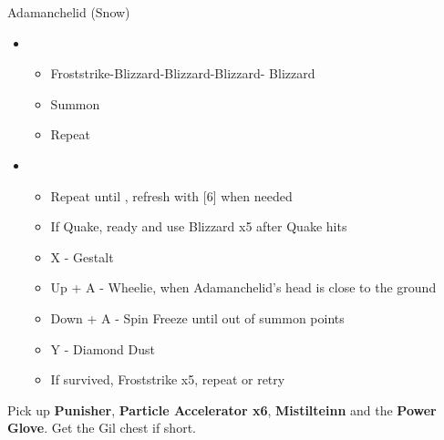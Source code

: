\begin{battle}[0:54]{Adamanchelid (Snow)}
	\begin{itemize}
		\item \sixth
		      \begin{itemize}
			      \item Froststrike-Blizzard-Blizzard-Blizzard- Blizzard
			      \item Summon
			      \item Repeat
		      \end{itemize}
		\item \fifth
		      \begin{itemize}
			      \item Repeat until \stagger, refresh with [6] when needed
			      \item If Quake, ready and use Blizzard x5 after Quake hits
			      \item X - Gestalt
			      \item Up + A - Wheelie, when Adamanchelid's head is close to the ground
			      \item Down + A - Spin Freeze until out of summon points
			      \item Y - Diamond Dust
			      \item If survived, Froststrike x5, repeat or retry
		      \end{itemize}
	\end{itemize}
\end{battle}

Pick up \textbf{Punisher}, \textbf{Particle Accelerator x6}, \textbf{Mistilteinn} and the \textbf{Power Glove}.
Get the Gil chest if short.

